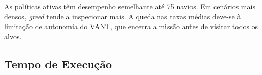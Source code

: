 As políticas ativas têm desempenho semelhante até 75 navios. Em cenários mais densos, \textit{greed} tende a inspecionar mais. A queda nas taxas médias deve-se à limitação de autonomia do VANT, que encerra a missão antes de visitar todos os alvos.







\subsection{Tempo de Execução}

